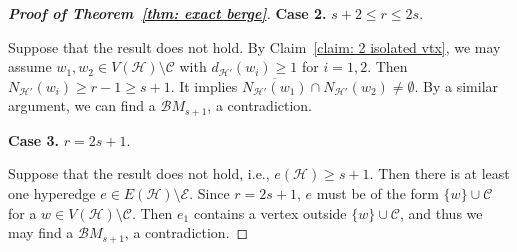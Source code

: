 \documentclass[11pt]{article}
\numberwithin{equation}{section}
\newcommand\cB{{\mathcal B}}
\newcommand\cC{{\mathcal C}}
\newcommand\cE{{\mathcal E}}
\newcommand\cH{{\mathcal H}}
\newcommand\cL{{\mathcal L}}
\newcommand\cM{{\mathcal M}}
\begin{document}
\begin{proof}[\bf Proof of Theorem~\ref{thm: exact berge}]
    \smallskip
    \noindent\textbf{Case 2.} $s+2\leq r\leq 2s$.
    \smallskip
    \smallskip

    Suppose that the result does not hold. By Claim~\ref{claim: 2 isolated vtx}, we may assume $w_1,w_2\in V(\cH)\setminus \cC$ with $d_{\cH'}(w_i)\geq 1$ for $i=1,2$. Then $N_{\cH'}(w_i)\geq r-1\geq s+1$. It implies $\overline{N_{\cH'}(w_1)}\cap N_{\cH'}(w_2)\neq \emptyset$. By a similar argument, we can find a $\cB M_{s+1}$, a contradiction.


    \smallskip
    \noindent\textbf{Case 3.} $r = 2s+1$.
    \smallskip
    \smallskip

    Suppose that the result does not hold, i.e., $e(\cH)\geq s+1$. Then there is at least one hyperedge $e \in E(\cH)\setminus \cE$. Since $r = 2s+1$, $e$ must be of the form $\{w\} \cup \cC$ for a $w \in V(\mathcal{H}) \setminus \cC$.
    Then $e_1$ contains a vertex outside $\{w\} \cup \cC$, and thus we may find a $\cB M_{s+1}$, a contradiction.

\end{proof}







\end{document}
